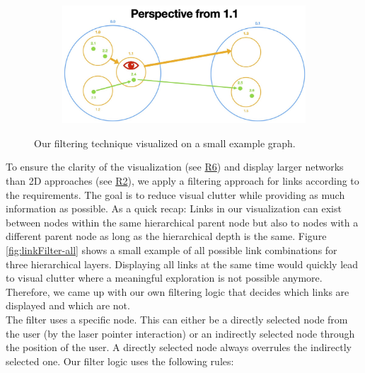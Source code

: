 \begin{figure}[p]
\begin{subfigure}{0.6\columnwidth}
        \label{fig:linkFilter-layer1}
    \end{subfigure}
    \begin{subfigure}{0.6\columnwidth}
        \centering
        \includegraphics[width=\textwidth]{graphics/filterLinks/layer1.jpg}
        \label{fig:linkFilter-layer2}
    \end{subfigure}
    \caption{Our filtering technique visualized on a small example graph.} %
  \end{figure}

To ensure the clarity of the visualization (see \hyperref[req:R6]{R6}) and display larger networks than 2D approaches (see \hyperref[req:R2]{R2}), we apply a filtering approach for links according to the requirements. 
The goal is to reduce visual clutter while providing as much information as possible. 
As a quick recap: Links in our visualization can exist between nodes within the same hierarchical parent node but also to nodes with a different parent node as long as the hierarchical depth is the same. Figure \ref{fig:linkFilter-all} shows a small example of all possible link combinations for three hierarchical layers.
Displaying all links at the same time would quickly lead to visual clutter where a meaningful exploration is not possible anymore. 
Therefore, we came up with our own filtering logic that decides which links are displayed and which are not.\\ 
The filter uses a specific node. This can either be a directly selected node from the user (by the laser pointer interaction) or an indirectly selected node through the position of the user. A directly selected node always overrules the indirectly selected one. Our filter logic uses the following rules:

